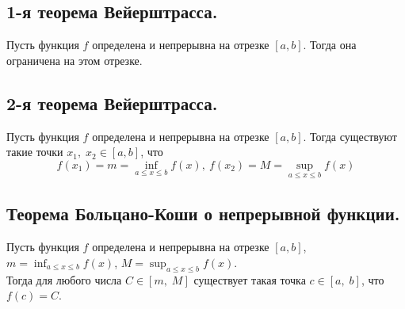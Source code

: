 

\label{sec_Definition02}
\begin{definition}
    \subsection*{1-я теорема Вейерштрасса.}
    \begin{note}[purple]
        Пусть функция $f$ определена и непрерывна на отрезке $[a, b]$. 
        Тогда она ограничена на этом отрезке.
    \end{note}

    \subsection*{2-я теорема Вейерштрасса.}
    \begin{note}[purple]
        Пусть функция $f$ определена и непрерывна на отрезке $[a, b]$. 
        Тогда существуют такие точки $x_1, \; x_2 \in [a, b]$, что 
        $$
            f(x_1) = m = \inf_{a \leq x \leq b} f(x), \ f(x_2) = M = \sup_{a \leq x \leq b} f(x)
        $$
    \end{note}

    \subsection*{Теорема Больцано-Коши о непрерывной функции.}
    \begin{note}[purple]
        Пусть функция $f$ определена и непрерывна на отрезке 
        $[a, b]$, $m = \displaystyle{\inf_{a \leq x \leq b} f(x)}$,
        $M = \displaystyle{\sup_{a \leq x \leq b} f(x)}$. \\

        Тогда для любого числа $C \in [m, \; M]$ существует такая точка 
        $c \in [a, \; b]$, что $f(c) = C$. 
    \end{note}
\end{definition}